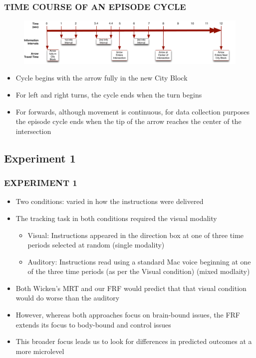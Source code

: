 \documentclass{beamer}
\begin{document}
\begin{frame} 
	\frametitle{TIME COURSE OF AN EPISODE CYCLE}
	\begin{figure}
	\centering
	\includegraphics[width=\textwidth]{../zNvBkFigs/Intrsctn-Epsd-Cycle-120305}
	\label{Epsd-Cycle}
	\end{figure}

	\begin{itemize}
		\item 	Cycle begins with the arrow fully in the new City Block
		\item For left and right turns, the cycle ends when the turn begins
		\item For forwards, although movement is continuous, for data collection purposes the episode cycle ends when the tip of the arrow reaches the center of the intersection
	\end{itemize} 
\end{frame}

\subsection{Experiment 1}


\begin{frame} 
	\frametitle{EXPERIMENT 1}
	\begin{itemize}
		\item  Two conditions: varied in how the instructions were delivered
		\item The tracking task in both conditions required the visual modality
		\begin{itemize}
			\item  Visual: Instructions appeared in the direction box at one of three time periods selected at random (single modality)
			\item Auditory: Instructions read using a standard Mac voice beginning at one of the three time periods (as per the Visual condition) (mixed modlaity)
		\end{itemize}
	\pause
	\item Both Wicken's MRT and our FRF would predict that that visual condition would do worse than the auditory
	\item However, whereas both approaches focus on brain-bound issues, the FRF extends its focus to body-bound and control issues
	\item This broader focus leads us to look for differences in predicted outcomes at a more microlevel
	\end{itemize} 
 \end{frame}
\end{document}
